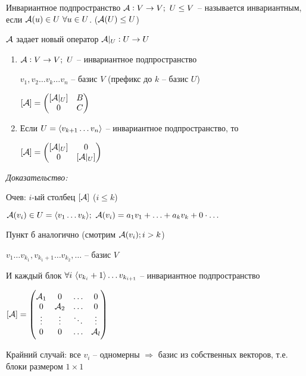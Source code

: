 \documentclass[12pt]{article}
\begin{document}
\begin{defin}{Инвариантное подпространство}
    $\mathcal{A} : V \to V;\ U \leq V$ -- называется инвариантным, если $\mathcal{A}(u) \in U\ \forall u \in U$. ($\mathcal{A}(U) \leq U$)
\end{defin}

\begin{Remark}{}
    $\mathcal{A}$ задает новый оператор $\mathcal{A}|_U : U \to U$
\end{Remark}

\begin{lem}{}
    \begin{enumerate}
        \item $\mathcal{A} : V \to V;\ U$ -- инвариантное подпространство

        $v_1, v_2 \ldots v_k \ldots v_n$ -- базис $V$ (префикс до $k$ -- базис $U$)

        $[\mathcal{A}] = \begin{pmatrix}
            [\mathcal{A}|_U] & B \\
            0 & C
        \end{pmatrix}$

        \item Если $U = \langle v_{k + 1} \ldots v_n \rangle$ -- инвариантное подпространство, то
        
        $[\mathcal{A}] = \begin{pmatrix}
            [\mathcal{A}|_U] & 0 \\
            0 & [\mathcal{A}|_U]
        \end{pmatrix}$
    \end{enumerate}
\end{lem}

\textit{Доказательство:}

Очев: $i$-ый столбец $[\mathcal{A}]$ ($i \leq k$)

$\A(v_i) \in U = \q{v_1 \ldots v_k};\ \A(v_i) = a_1v_1 + \ldots + a_kv_k + 0 \cdot \ldots$

Пункт б аналогично (смотрим $\mathcal{A}(v_i); i > k$)

\begin{Remark}{}
    $v_1 \ldots v_{k_1}, v_{k_1 + 1} \ldots v_{k_2}, \ldots$ -- базис $V$

    И каждый блок $\forall i\ \langle v_{k_i} + 1 \rangle \ldots v_{k_{i + 1}}$ -- инвариантное подпространство

    $[\mathcal{A}] = \begin{pmatrix}
        \mathcal{A}_1 & 0 & \ldots & 0 \\
        0 & \mathcal{A}_2 & \ldots & 0 \\
        \vdots & \vdots & \ddots & \vdots \\
        0 & 0 & \ldots & \mathcal{A}_l 
    \end{pmatrix}$

    Крайний случай: все $v_i$ -- одномерны $\Rightarrow$ базис из собственных векторов, т.е. блоки размером $1 \times 1$
\end{Remark}
\end{document}
